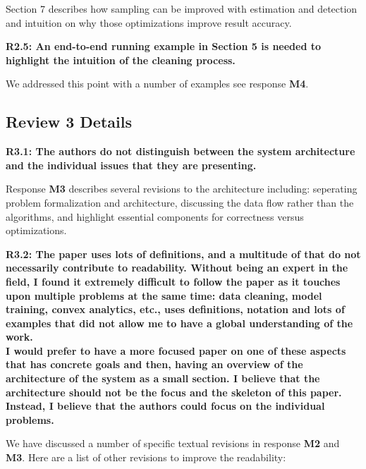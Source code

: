 \vspace{0.5em}

Section 7 describes how sampling can be improved with estimation and detection and intuition on why those optimizations improve result accuracy.

\vspace{0.5em}

\textbf{R2.5: An end-to-end running example in Section 5 is needed to highlight the intuition of the cleaning process.}

We addressed this point with a number of examples see response \textbf{M4}.


\vspace{0.5em}


\subsection*{Review 3 Details}
\noindent\textbf{R3.1: The authors do not distinguish between the system architecture and the individual issues that they are presenting.}

Response \textbf{M3} describes several revisions to the architecture including: seperating problem formalization and architecture, discussing the data flow rather than the algorithms, and highlight essential components for correctness versus optimizations.

\vspace{0.5em}

\noindent\textbf{R3.2: The paper uses lots of definitions, and a multitude of that do not necessarily contribute to readability.
Without being an expert in the field, I found it extremely difficult to follow the paper as it touches upon multiple problems at the same time: data cleaning, model training, convex analytics, etc., uses definitions, notation and lots of examples that did not allow me to have a global understanding of the work.\\
I would prefer to have a more focused paper on one of these aspects that has concrete goals and then, having an overview of the architecture of the system as a small section. I believe that the architecture should not be the focus and the skeleton of this paper. Instead, I believe that the authors could focus on the individual problems.}

We have discussed a number of specific textual revisions in response \textbf{M2} and \textbf{M3}. Here are a list of other revisions to improve the readability:

